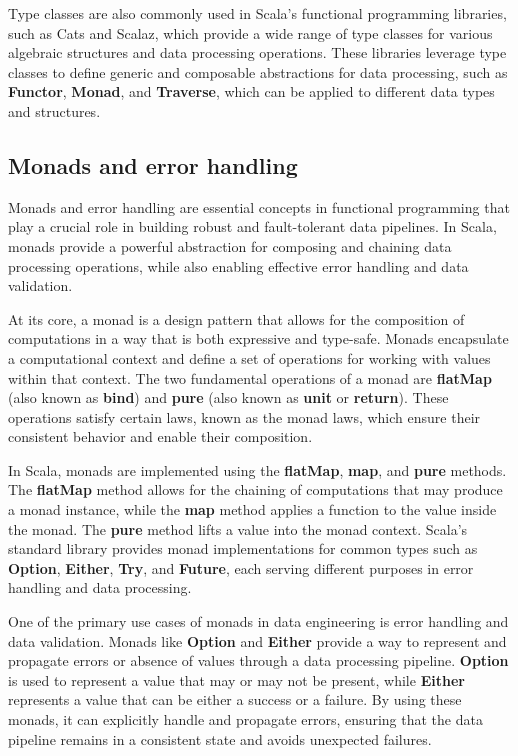 Type classes are also commonly used in Scala's functional programming libraries, such as Cats and Scalaz, which provide a wide range of type classes for various algebraic structures and data processing operations. These libraries leverage type classes to define generic and composable abstractions for data processing, such as \textbf{Functor}, \textbf{Monad}, and \textbf{Traverse}, which can be applied to different data types and structures.

\subsection{Monads and error handling}

Monads and error handling are essential concepts in functional programming that play a crucial role in building robust and fault-tolerant data pipelines. In Scala, monads provide a powerful abstraction for composing and chaining data processing operations, while also enabling effective error handling and data validation.

At its core, a monad is a design pattern that allows for the composition of computations in a way that is both expressive and type-safe. Monads encapsulate a computational context and define a set of operations for working with values within that context. The two fundamental operations of a monad are \textbf{flatMap} (also known as \textbf{bind}) and \textbf{pure} (also known as \textbf{unit} or \textbf{return}). These operations satisfy certain laws, known as the monad laws, which ensure their consistent behavior and enable their composition.

In Scala, monads are implemented using the \textbf{flatMap}, \textbf{map}, and \textbf{pure} methods. The \textbf{flatMap} method allows for the chaining of computations that may produce a monad instance, while the \textbf{map} method applies a function to the value inside the monad. The \textbf{pure} method lifts a value into the monad context. Scala's standard library provides monad implementations for common types such as \textbf{Option}, \textbf{Either}, \textbf{Try}, and \textbf{Future}, each serving different purposes in error handling and data processing.

One of the primary use cases of monads in data engineering is error handling and data validation. Monads like \textbf{Option} and \textbf{Either} provide a way to represent and propagate errors or absence of values through a data processing pipeline. \textbf{Option} is used to represent a value that may or may not be present, while \textbf{Either} represents a value that can be either a success or a failure. By using these monads,  it can explicitly handle and propagate errors, ensuring that the data pipeline remains in a consistent state and avoids unexpected failures.


